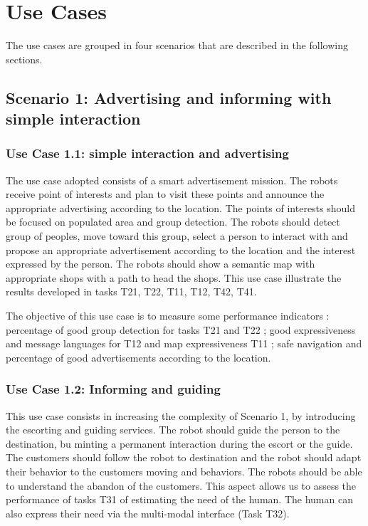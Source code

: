 \section{Use Cases}
\label{sec:usecases}

The use cases are grouped in four scenarios that are described in the following sections.

\subsection{Scenario 1: Advertising and informing with simple interaction} 

\subsubsection*{Use Case 1.1: simple interaction and advertising} 

The use case adopted consists of a smart advertisement mission. The robots receive point of interests and plan to visit these points and announce the appropriate advertising according to the location. The points of interests should be focused on populated area and group detection. The robots should detect group of peoples, move toward this group, select a person to interact with and propose an appropriate advertisement according to the location and the interest expressed by the person. The robots should show a semantic map with appropriate shops with a path to head the shops. This use case illustrate the results developed in tasks T21, T22, T11, T12, T42, T41. 

The objective of this use case is to measure some performance indicators : percentage of good group detection for tasks T21 and T22 ; good expressiveness and message languages for T12 and map expressiveness T11 ; safe navigation and percentage of good advertisements according to the location. 

\subsubsection*{Use Case 1.2: Informing and guiding}

This use case consists in increasing the complexity of Scenario 1, by introducing the escorting and guiding services. The robot should guide the person to the destination, bu minting a permanent interaction during the escort or the guide. The customers should follow the robot to destination and the robot should adapt their behavior to the customers moving and behaviors.  The robots should be able to understand the abandon of the customers. This aspect allows us to assess the performance of  tasks T31 of estimating the need of the human. The human can also express their need via the multi-modal interface (Task T32).

